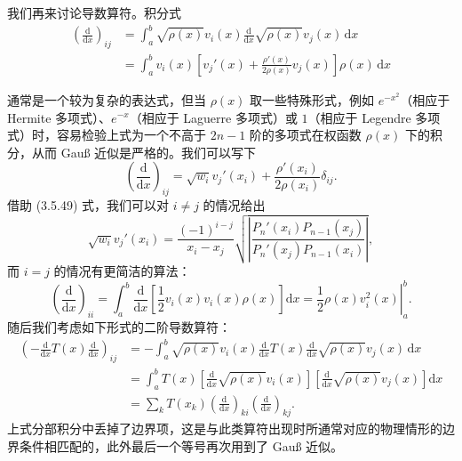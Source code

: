 我们再来讨论导数算符。积分式
\begin{equation}
\begin{aligned}
\left(\frac{\mathrm d}{\mathrm dx}\right)_{ij}
&=\int_a^b\sqrt{\rho(x)}v_i(x)\frac{\mathrm d}{\mathrm dx}\sqrt{\rho(x)}v_j(x)\,\mathrm dx\\
&=\int_a^b v_i(x)\left[v_j'(x)+\frac{\rho'(x)}{2\rho(x)}v_j(x)\right]\rho(x)\,\mathrm dx
\end{aligned}
\tag{5.4.46}
\end{equation}

通常是一个较为复杂的表达式，但当 $\rho(x)$ 取一些特殊形式，例如 $e^{-x^2}$（相应于 Hermite 多项式）、$e^{-x}$（相应于 Laguerre 多项式）或 $1$（相应于 Legendre 多项式）时，容易检验上式为一个不高于 $2n-1$ 阶的多项式在权函数 $\rho(x)$ 下的积分，从而 Gauß 近似是严格的。我们可以写下
\begin{equation}
\left(\frac{\mathrm d}{\mathrm dx}\right)_{ij}=\sqrt{w_i}v_j'(x_i)+\frac{\rho'(x_i)}{2\rho(x_i)}\delta_{ij}.
\tag{5.4.47}
\end{equation}
借助 (3.5.49) 式，我们可以对 $i\ne j$ 的情况给出
\begin{equation}
\sqrt{w_i}v_j'(x_i)=\frac{(-1)^{i-j}}{x_i-x_j}
\sqrt{\left|\frac{P_n'(x_i)P_{n-1}(x_j)}{P_n'(x_j)P_{n-1}(x_i)}\right|},
\tag{5.4.48}
\end{equation}
而 $i=j$ 的情况有更简洁的算法：
\begin{equation}
\left(\frac{\mathrm d}{\mathrm dx}\right)_{ii}
=\int_a^b\frac{\mathrm d}{\mathrm dx}\left[\frac12 v_i(x)v_i(x)\rho(x)\right]\mathrm dx
=\left.\frac12\rho(x)v_i^2(x)\right|_a^b.
\tag{5.4.49}
\end{equation}
随后我们考虑如下形式的二阶导数算符：
\begin{equation}
\begin{aligned}
\left(-\frac{\mathrm d}{\mathrm dx}T(x)\frac{\mathrm d}{\mathrm dx}\right)_{ij}
&=-\int_a^b\sqrt{\rho(x)}v_i(x)\frac{\mathrm d}{\mathrm dx}T(x)\frac{\mathrm d}{\mathrm dx}\sqrt{\rho(x)}v_j(x)\,\mathrm dx\\
&=\int_a^bT(x)\left[\frac{\mathrm d}{\mathrm dx}\sqrt{\rho(x)}v_i(x)\right]
\left[\frac{\mathrm d}{\mathrm dx}\sqrt{\rho(x)}v_j(x)\right]\mathrm dx\\
&=\sum_kT(x_k)\left(\frac{\mathrm d}{\mathrm dx}\right)_{ki}
\left(\frac{\mathrm d}{\mathrm dx}\right)_{kj}.
\end{aligned}
\tag{5.4.50}
\end{equation}
上式分部积分中丢掉了边界项，这是与此类算符出现时所通常对应的物理情形的边界条件相匹配的，此外最后一个等号再次用到了 Gauß 近似。

